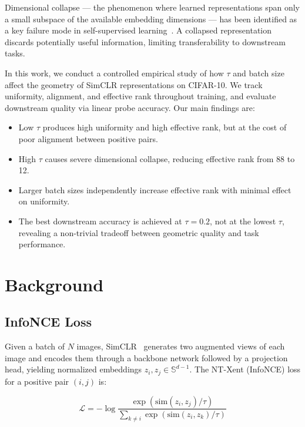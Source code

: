 \documentclass{article}
\begin{document}
Dimensional collapse --- the phenomenon where learned representations span only 
a small subspace of the available embedding dimensions --- has been identified 
as a key failure mode in self-supervised learning~\cite{hua2021feature}. A 
collapsed representation discards potentially useful information, limiting 
transferability to downstream tasks.

In this work, we conduct a controlled empirical study of how $\tau$ and batch 
size affect the geometry of SimCLR representations on CIFAR-10. We track 
uniformity, alignment, and effective rank throughout training, and evaluate 
downstream quality via linear probe accuracy. Our main findings are:

\begin{itemize}
    \item Low $\tau$ produces high uniformity and high effective rank, but 
    at the cost of poor alignment between positive pairs.
    \item High $\tau$ causes severe dimensional collapse, reducing effective 
    rank from 88 to 12.
    \item Larger batch sizes independently increase effective rank with 
    minimal effect on uniformity.
    \item The best downstream accuracy is achieved at $\tau=0.2$, not at 
    the lowest $\tau$, revealing a non-trivial tradeoff between geometric 
    quality and task performance.
\end{itemize}

\section{Background}

\subsection{InfoNCE Loss}

Given a batch of $N$ images, SimCLR~\cite{chen2020simple} generates two augmented 
views of each image and encodes them through a backbone network followed by a 
projection head, yielding normalized embeddings $z_i, z_j \in \mathbb{S}^{d-1}$. 
The NT-Xent (InfoNCE) loss for a positive pair $(i, j)$ is:

\begin{equation}
  \mathcal{L} = -\log \frac{\exp(\text{sim}(z_i, z_j)/\tau)}
    {\sum_{k \neq i} \exp(\text{sim}(z_i, z_k)/\tau)}
\end{equation}
\end{document}
